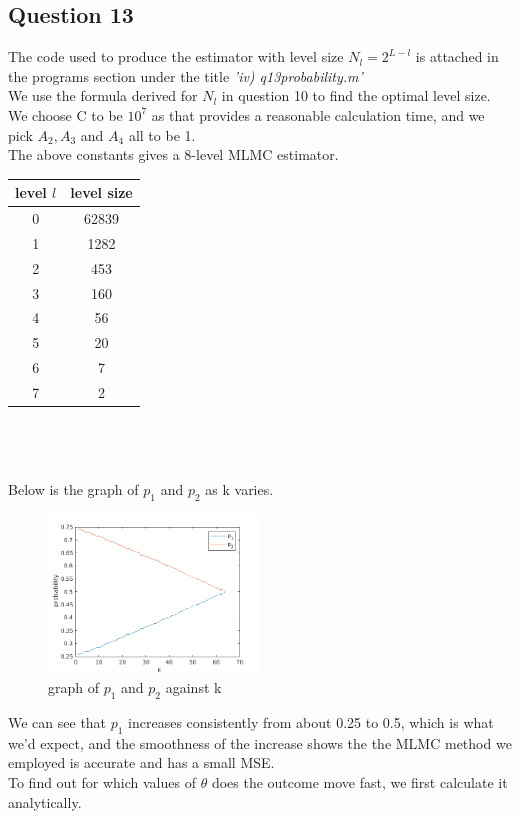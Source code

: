 \documentclass[10pt]{article}
\begin{document}
\subsection*{Question 13}
The code used to produce the estimator with level size $N_l=2^{L-l}$ is attached in the programs section under the title \emph{'iv) q13\textunderscore probability.m'}\\
We use the formula derived for $N_l$ in question 10 to find the optimal level size. We choose C to be $10^7$ as that provides a reasonable calculation time, and we pick $A_2, A_3$ and $A_4$ all to be 1.\\
The above constants gives a 8-level MLMC estimator.\\
\begin{tabular}{|c|c|}
\hline
level $l$ & level size\\
\hline
0     & 62839\\
1    & 1282\\
2     & 453\\
3     & 160\\
4    & 56\\
5     & 20\\
6    & 7\\
7   &  2\\
\hline
\end{tabular}\\\\\\
Below is the graph of $p_1$ and $p_2$ as k varies.
\begin{figure}[h]
    \centering
    \includegraphics[width=0.5\textwidth]{q13/q13.png}
    \caption{graph of $p_1$ and $p_2$ against k}
\end{figure}
\noindent
We can see that $p_1$ increases consistently from about 0.25 to 0.5, which is what we'd expect, and the smoothness of the increase shows the the MLMC method we employed is accurate and has a small MSE.\\
\newpage
\noindent
To find out for which values of $\theta$ does the outcome move fast, we first calculate it analytically.
\end{document}
